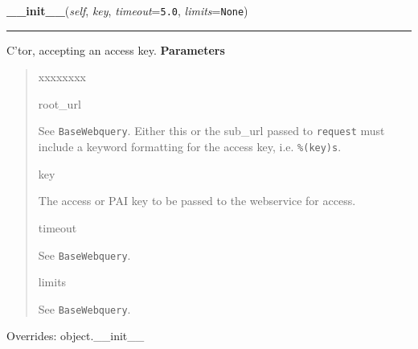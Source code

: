 \hspace{.8\funcindent}\begin{boxedminipage}{\funcwidth}

    \raggedright \textbf{\_\_init\_\_}(\textit{self}, \textit{key}, \textit{timeout}={\tt 5.0}, \textit{limits}={\tt None})

    \vspace{-1.5ex}

    \rule{\textwidth}{0.5\fboxrule}
\setlength{\parskip}{2ex}

C'tor, accepting an access key.
\setlength{\parskip}{1ex}
      \textbf{Parameters}
      \vspace{-1ex}

      \begin{quote}
        \begin{Ventry}{xxxxxxxx}

          \item[root\_url]


See \texttt{BaseWebquery}. Either this or the sub{\_}url passed to \texttt{request}
must include a keyword formatting for the access key, i.e.
\texttt{{\%}(key)s}.
          \item[key]


The access or PAI key to be passed to the webservice for access.
          \item[timeout]


See \texttt{BaseWebquery}.
          \item[limits]


See \texttt{BaseWebquery}.
        \end{Ventry}

      \end{quote}

      Overrides: object.\_\_init\_\_

    \end{boxedminipage}

    \label{biblio:webquery:isbndb:IsbndbQuery:query_service}

    \vspace{0.5ex}

